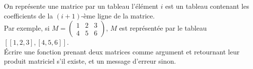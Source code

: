 On représente une matrice par un tableau l'élément $i$ est un tableau
contenant les coefficients de la $(i+1)$-ème ligne de la matrice.\\
Par exemple, si $M=\begin{pmatrix} 1&2&3\\4&5&6\end{pmatrix}$, $M$ est
représentée par le tableau $[[1,2,3],[4,5,6]]$.\\
Écrire une fonction prenant deux matrices comme argument et retournant leur
produit matriciel s'il existe, et un message d'erreur sinon.